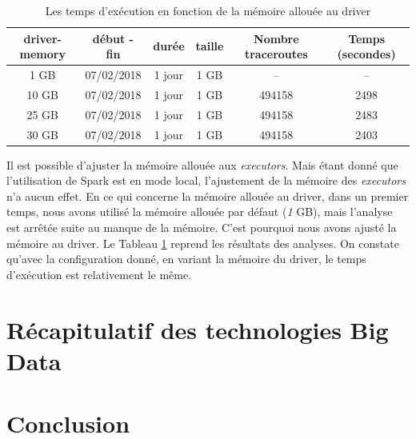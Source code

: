 \begin{table}[H]
	\begin{tabular}{cccccc}
	 \textbf{driver-memory}&	\textbf{début - fin} &\textbf{durée}  & \textbf{taille}  & \textbf{Nombre traceroutes} & \textbf{Temps (secondes)}  \\ \hline
			1 GB&	07/02/2018&1 jour&1 GB& --& -- \\ \hline 
	10 GB&	07/02/2018&1 jour&1 GB&494158& 2498 %
	 \\ \hline 
	25 GB&	07/02/2018&1 jour&1 GB&   494158   & 2483 %
	\\ \hline
	

	30 GB&	07/02/2018&1 jour&1 GB&   494158   & 2403 
	\\ \hline
	
	
	\end{tabular}
	\caption{Les temps d'exécution en fonction de la mémoire allouée au driver }
	\label{tab:spark-timing-driver}
\end{table}


Il est possible d'ajuster la mémoire allouée aux \textit{executors}. Mais étant donné que l'utilisation de Spark est en mode local, l'ajustement de la mémoire des \textit{executors} n'a aucun effet. En ce qui concerne la mémoire allouée au driver, dans un premier temps,  nous avons utilisé la mémoire allouée par défaut (\textit{1} GB), mais l'analyse est arrêtée suite au manque de la mémoire.  C'est pourquoi nous avons ajusté la mémoire au driver. Le Tableau 
\ref{tab:spark-timing-driver} reprend les résultats des analyses. On constate qu'avec la configuration donné, en variant  la mémoire du driver, le temps d'exécution est relativement le même. 


\section{Récapitulatif des technologies Big Data}

\section{Conclusion}



